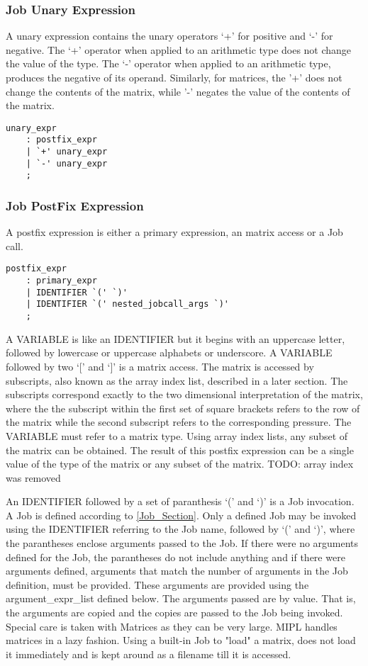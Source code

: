 \documentclass[prodmode,acmtecs]{acmsmall}
\begin{document}
\subsubsection{Job Unary Expression}
  
A unary expression contains the unary operators `+' for positive and `-' 
for negative. The `+' operator when applied to an arithmetic type does
not change the value of the type. The `-' operator when applied to an
arithmetic type, produces the negative of its operand. Similarly, for
matrices, the '+' does not change the contents of the matrix, while
'-' negates the value of the contents of the matrix.


\begin{lstlisting}
unary_expr
	: postfix_expr
	| `+' unary_expr
	| `-' unary_expr
	;
\end{lstlisting}
\medskip

\subsubsection{Job PostFix Expression}

A postfix expression is either a primary expression, an matrix access or 
a Job call.

\begin{lstlisting}
postfix_expr
	: primary_expr
	| IDENTIFIER `(' `)'
	| IDENTIFIER `(' nested_jobcall_args `)'
	;
\end{lstlisting}
\label{Job_PostFix_Expression}

A VARIABLE is like an IDENTIFIER but it begins with an uppercase letter,
followed by lowercase or uppercase alphabets or underscore. A VARIABLE
followed by two `[' and `]' is a matrix access. The matrix is accessed
by subscripts, also known as the array index list, described in a later
section. The subscripts correspond exactly to the two dimensional 
interpretation of the matrix, where the the subscript within the first 
set of square brackets refers to the row of the matrix while the second
subscript refers to the corresponding pressure. The VARIABLE must refer 
to a matrix type. Using array index lists, any subset of the matrix can be
obtained. The result of this postfix expression can be a single value of
the type of the matrix or any subset of the matrix.
TODO: array index was removed

An IDENTIFIER followed by a set of paranthesis `(' and `)' is a Job
invocation. A Job is defined according to \ref{Job_Section}. Only a defined
Job may be invoked using the IDENTIFIER referring to the Job name,
followed by `(' and `)', where the parantheses enclose arguments passed
to the Job. If there were no arguments defined for the Job, the
parantheses do not include anything and if there were arguments defined, 
arguments that match the number of arguments in the Job definition, must
be provided. These arguments are provided using the argument\_expr\_list 
defined below. The arguments passed are by value. That is, the arguments 
are copied and the copies are passed to the Job being invoked. Special
care is taken with Matrices as they can be very large. MIPL handles 
matrices in a lazy fashion. Using a built-in Job to "load" a matrix, 
does not load it immediately and is kept around as a filename till it is
accessed.
\medskip
\end{document}
